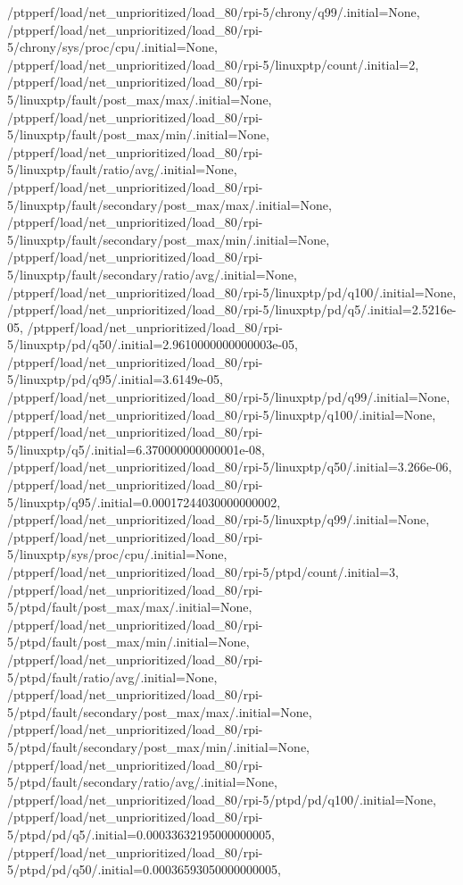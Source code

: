 {    /ptpperf/load/net_unprioritized/load_80/rpi-5/chrony/q99/.initial=None,
    /ptpperf/load/net_unprioritized/load_80/rpi-5/chrony/sys/proc/cpu/.initial=None,
    /ptpperf/load/net_unprioritized/load_80/rpi-5/linuxptp/count/.initial=2,
    /ptpperf/load/net_unprioritized/load_80/rpi-5/linuxptp/fault/post_max/max/.initial=None,
    /ptpperf/load/net_unprioritized/load_80/rpi-5/linuxptp/fault/post_max/min/.initial=None,
    /ptpperf/load/net_unprioritized/load_80/rpi-5/linuxptp/fault/ratio/avg/.initial=None,
    /ptpperf/load/net_unprioritized/load_80/rpi-5/linuxptp/fault/secondary/post_max/max/.initial=None,
    /ptpperf/load/net_unprioritized/load_80/rpi-5/linuxptp/fault/secondary/post_max/min/.initial=None,
    /ptpperf/load/net_unprioritized/load_80/rpi-5/linuxptp/fault/secondary/ratio/avg/.initial=None,
    /ptpperf/load/net_unprioritized/load_80/rpi-5/linuxptp/pd/q100/.initial=None,
    /ptpperf/load/net_unprioritized/load_80/rpi-5/linuxptp/pd/q5/.initial=2.5216e-05,
    /ptpperf/load/net_unprioritized/load_80/rpi-5/linuxptp/pd/q50/.initial=2.9610000000000003e-05,
    /ptpperf/load/net_unprioritized/load_80/rpi-5/linuxptp/pd/q95/.initial=3.6149e-05,
    /ptpperf/load/net_unprioritized/load_80/rpi-5/linuxptp/pd/q99/.initial=None,
    /ptpperf/load/net_unprioritized/load_80/rpi-5/linuxptp/q100/.initial=None,
    /ptpperf/load/net_unprioritized/load_80/rpi-5/linuxptp/q5/.initial=6.370000000000001e-08,
    /ptpperf/load/net_unprioritized/load_80/rpi-5/linuxptp/q50/.initial=3.266e-06,
    /ptpperf/load/net_unprioritized/load_80/rpi-5/linuxptp/q95/.initial=0.00017244030000000002,
    /ptpperf/load/net_unprioritized/load_80/rpi-5/linuxptp/q99/.initial=None,
    /ptpperf/load/net_unprioritized/load_80/rpi-5/linuxptp/sys/proc/cpu/.initial=None,
    /ptpperf/load/net_unprioritized/load_80/rpi-5/ptpd/count/.initial=3,
    /ptpperf/load/net_unprioritized/load_80/rpi-5/ptpd/fault/post_max/max/.initial=None,
    /ptpperf/load/net_unprioritized/load_80/rpi-5/ptpd/fault/post_max/min/.initial=None,
    /ptpperf/load/net_unprioritized/load_80/rpi-5/ptpd/fault/ratio/avg/.initial=None,
    /ptpperf/load/net_unprioritized/load_80/rpi-5/ptpd/fault/secondary/post_max/max/.initial=None,
    /ptpperf/load/net_unprioritized/load_80/rpi-5/ptpd/fault/secondary/post_max/min/.initial=None,
    /ptpperf/load/net_unprioritized/load_80/rpi-5/ptpd/fault/secondary/ratio/avg/.initial=None,
    /ptpperf/load/net_unprioritized/load_80/rpi-5/ptpd/pd/q100/.initial=None,
    /ptpperf/load/net_unprioritized/load_80/rpi-5/ptpd/pd/q5/.initial=0.00033632195000000005,
    /ptpperf/load/net_unprioritized/load_80/rpi-5/ptpd/pd/q50/.initial=0.00036593050000000005,
}
